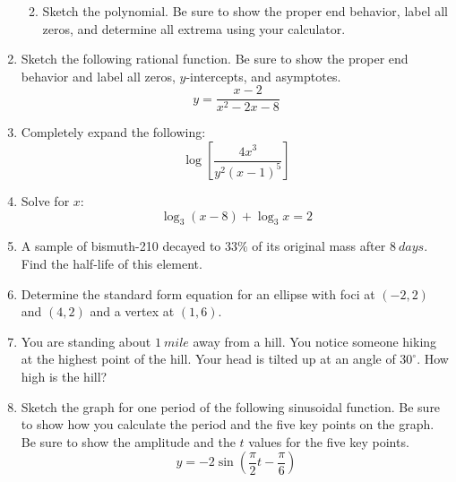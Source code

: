 \documentclass[letterpaper,12pt,fleqn]{article}
\begin{document}
\begin{enumerate}
\begin{enumerate}
    \vspace{4in}

  \item Sketch the polynomial. Be sure to show the proper end behavior,
    label all zeros, and determine all extrema using your calculator.
  
  \end{enumerate}

\item Sketch the following rational function. Be sure to show the proper
  end behavior and label all zeros, $y$-intercepts, and asymptotes.
  \[y=\frac{x-2}{x^2-2x-8}\]


\item Completely expand the following:
  \[\log\left[\frac{4x^3}{y^2(x-1)^5}\right]\]

  \newpage

\item Solve for $x$:
  \[\log_3(x-8)+\log_3x=2\]

  \vspace{3.5in}

\item A sample of bismuth-210 decayed to $33\%$ of its original mass after
  $\SI{8}{days}$. Find the half-life of this element.

  \newpage

\item Determine the standard form equation for an ellipse with foci at
  $(-2,2)$ and $(4,2)$ and a vertex at $(1,6)$.

  \vspace{4in}

\item You are standing about $\SI{1}{mile}$ away from a hill. You notice
  someone hiking at the highest point of the hill. Your head is tilted up
  at an angle of $30^{\circ}$. How high is the hill?

  \newpage

\item Sketch the graph for one period of the following sinusoidal function. Be
  sure to show how you calculate the period and the five key points on the
  graph. Be sure to show the amplitude and the $t$ values for the five key
  points.
  \[y=-2\sin\left(\frac{\pi}{2}t-\frac{\pi}{6}\right)\]
  

\end{enumerate}
\end{document}
